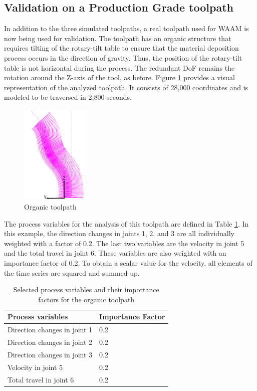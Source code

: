 \subsection{Validation on a Production Grade toolpath}\label{RG}
In addition to the three simulated toolpaths, a real toolpath used for \acrshort{WAAM} is now being used for validation. The toolpath has an organic structure that requires tilting of the rotary-tilt table to ensure that the material deposition process occurs in the direction of gravity. Thus, the position of the rotary-tilt table is not horizontal during the process. The redundant \acrshort{DoF} remains the rotation around the Z-axis of the tool, as before. Figure \ref{rav} provides a visual representation of the analyzed toolpath. It consists of 28,000 coordinates and is modeled to be traversed in 2,800 seconds.

\begin{figure}[H]
	\centerline{\includegraphics[width=0.3\textwidth]{figures/raven.png}}
	\caption{Organic toolpath  \cite{Reisch.2023}}
	\label{rav}
\end{figure}

The process variables for the analysis of this toolpath are defined in Table \ref{ravenparams}. In this example, the direction changes in joints 1, 2, and 3 are all individually weighted with a factor of 0.2. The last two variables are the velocity in joint 5 and the total travel in joint 6. These variables are also weighted with an importance factor of 0.2. To obtain a scalar value for the velocity, all elements of the time series are squared and summed up. 

\begin{table}[H]
	\centering
	\begin{tabular}{||l|l||}
		Process variables& Importance Factor \\
		\hline
		\hline
		\hline
		Direction changes in joint 1	&		0.2 \\
		Direction changes in joint 2	&		0.2 \\
		Direction changes in joint 3	&		0.2 \\
		Velocity in joint 5	&		0.2 \\
		Total travel in joint 6	&		0.2 \\
		\hline
		\hline
	\end{tabular}
	
	\caption{Selected process variables and their importance factors for the organic toolpath}
	\label{ravenparams}
\end{table}

